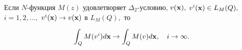 \smallskip

\hypertarget{kozh:lemma1}{}

\begin{lemma}[1]Если $N$-функция $M(z)$ удовлетворяет $\Delta_2$-условию,  $v({\bf x}),$ $v^i({\bf x})\in L_M(Q),$ $i=1, 2,\ldots,$ $v^i({\bf x}) \to  v({\bf x})$ в $L_M(Q),$ то

\begin{equation}\label{eq:Kozh:lem_1}

\int_Q M(v^i)d{\bf x} \to \int_Q M(v)d{\bf x},\quad i \to  \infty.

\end{equation}

\end{lemma}







